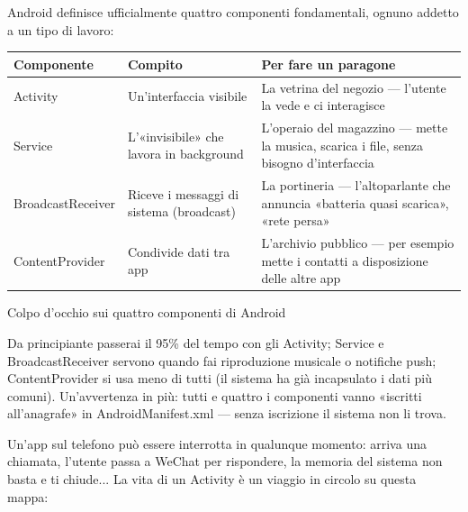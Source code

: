 


Android definisce ufficialmente quattro componenti fondamentali, ognuno addetto a un tipo di lavoro:

\begin{center}
\begin{tabularx}{\linewidth}{|X|X|X|}
\hline
\textbf{Componente} & \textbf{Compito} & \textbf{Per fare un paragone} \tabularnewline
\hline
Activity & Un'interfaccia visibile & La vetrina del negozio — l'utente la vede e ci interagisce \tabularnewline
Service & L'«invisibile» che lavora in background & L'operaio del magazzino — mette la musica, scarica i file, senza bisogno d'interfaccia \tabularnewline
BroadcastReceiver & Riceve i messaggi di sistema (broadcast) & La portineria — l'altoparlante che annuncia «batteria quasi scarica», «rete persa» \tabularnewline
ContentProvider & Condivide dati tra app & L'archivio pubblico — per esempio mette i contatti a disposizione delle altre app \tabularnewline
\hline
\end{tabularx}
\end{center}

\begin{center}\small\color{gray}Colpo d'occhio sui quattro componenti di Android\end{center}

Da principiante passerai il 95\% del tempo con gli Activity; Service e BroadcastReceiver servono quando fai riproduzione musicale o notifiche push; ContentProvider si usa meno di tutti (il sistema ha già incapsulato i dati più comuni). Un'avvertenza in più: tutti e quattro i componenti vanno «iscritti all'anagrafe» in AndroidManifest.xml — senza iscrizione il sistema non li trova.


Un'app sul telefono può essere interrotta in qualunque momento: arriva una chiamata, l'utente passa a WeChat per rispondere, la memoria del sistema non basta e ti chiude... La vita di un Activity è un viaggio in circolo su questa mappa:

